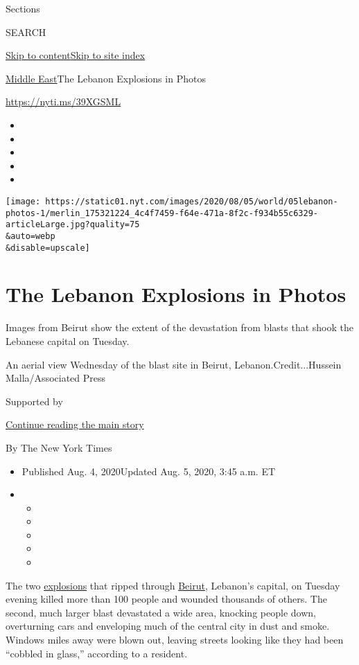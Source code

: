 Sections

SEARCH

\protect\hyperlink{site-content}{Skip to
content}\protect\hyperlink{site-index}{Skip to site index}

\href{/section/world/middleeast}{Middle East}\textbar{}The Lebanon
Explosions in Photos

\url{https://nyti.ms/39XGSML}

\begin{itemize}
\item
\item
\item
\item
\item
\end{itemize}

\texttt{[image: https://static01.nyt.com/images/2020/08/05/world/05lebanon-photos-1/merlin\_175321224\_4c4f7459-f64e-471a-8f2c-f934b55c6329-articleLarge.jpg?quality=75\\\&auto=webp\\\&disable=upscale]}

\hypertarget{the-lebanon-explosions-in-photos}{%
\section{The Lebanon Explosions in
Photos}\label{the-lebanon-explosions-in-photos}}

Images from Beirut show the extent of the devastation from blasts that
shook the Lebanese capital on Tuesday.

An aerial view Wednesday of the blast site in Beirut,
Lebanon.Credit...Hussein Malla/Associated Press

Supported by

\protect\hyperlink{after-sponsor}{Continue reading the main story}

By The New York Times

\begin{itemize}
\item
  Published Aug. 4, 2020Updated Aug. 5, 2020, 3:45 a.m. ET
\item
  \begin{itemize}
  \item
  \item
  \item
  \item
  \item
  \end{itemize}
\end{itemize}

The two
\href{https://www.nytimes.com/2020/08/05/world/middleeast/beirut-explosion.html}{explosions}
that ripped through
\href{https://www.nytimes.com/2020/08/04/world/middleeast/lebanon-explosion-beirut.html}{Beirut},
Lebanon's capital, on Tuesday evening killed more than 100 people and
wounded thousands of others. The second, much larger blast devastated a
wide area, knocking people down, overturning cars and enveloping much of
the central city in dust and smoke. Windows miles away were blown out,
leaving streets looking like they had been ``cobbled in glass,''
according to a resident.

